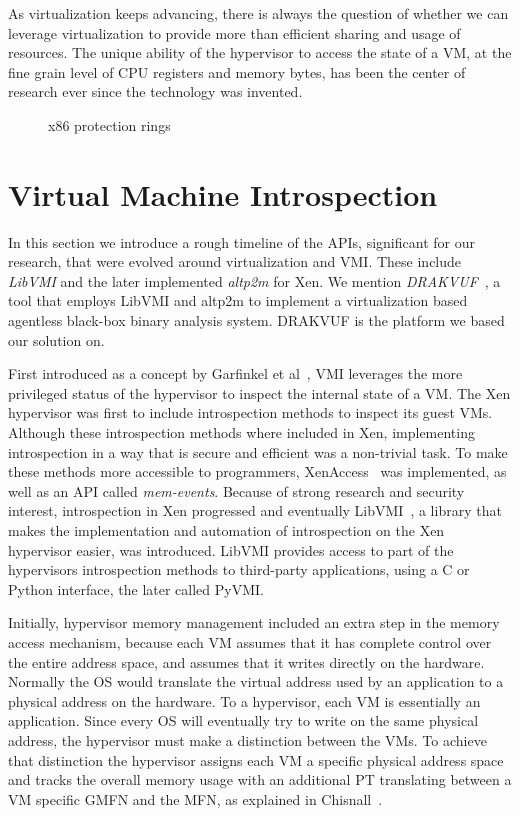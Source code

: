 As virtualization keeps advancing, there is always the question of whether we can leverage virtualization to provide more than efficient sharing and usage of resources. The unique ability of the hypervisor to access the state of a \ac{VM}, at the fine grain level of \ac{CPU} registers and memory bytes, has been the center of research ever since the technology was invented. 

\begin{figure}
	\centering
	
	\caption{x86 protection rings}
	\label{fig:rings}
\end{figure}

\section{Virtual Machine Introspection}\label{sec:vmi}
In this section we introduce a rough timeline of the \acp{API}, significant for our research, that were evolved around virtualization and \ac{VMI}. These include \emph{LibVMI} and the later implemented \emph{altp2m} for Xen. We mention \emph{DRAKVUF}~\cite{lengyel2014drakvuf}, a tool that employs LibVMI and altp2m to implement a virtualization based agentless black-box binary analysis system. DRAKVUF is the platform we based our solution on. 	

\par First introduced as a concept by Garfinkel et al~\cite{garfinkel2003virtual}, \ac{VMI} leverages the more privileged status of the hypervisor to inspect the internal state of a \ac{VM}. The Xen hypervisor was first to include introspection methods to inspect its guest \ac{VM}s. Although these introspection methods where included in Xen, implementing introspection in a way that is secure and efficient was a non-trivial task. To make these methods more accessible to programmers, XenAccess~\cite{payne2007secure} was implemented, as well as an \ac{API} called \emph{mem-events}. Because of strong research and security interest, introspection in Xen progressed and eventually LibVMI~\cite{payne2011libvmi}, a library that makes the implementation and automation of introspection on the Xen hypervisor easier, was introduced. LibVMI provides access to part of the hypervisors introspection methods to third-party applications, using a C or Python interface, the later called PyVMI. 

\par Initially, hypervisor memory management included an extra step in the memory access mechanism, because each \ac{VM} assumes that it has complete control over the entire address space, and assumes that it writes directly on the hardware. Normally the \ac{OS} would translate the virtual address used by an application to a physical address on the hardware. To a hypervisor, each \ac{VM} is essentially an application. Since every \ac{OS} will eventually try to write on the same physical address, the hypervisor must make a distinction between the \ac{VM}s. To achieve that distinction the hypervisor assigns each \ac{VM} a specific physical address space and tracks the overall memory usage with an additional \ac{PT} translating between a \ac{VM} specific \ac{GMFN} and the \ac{MFN}, as explained in Chisnall~\cite{chisnall2008definitive}.

